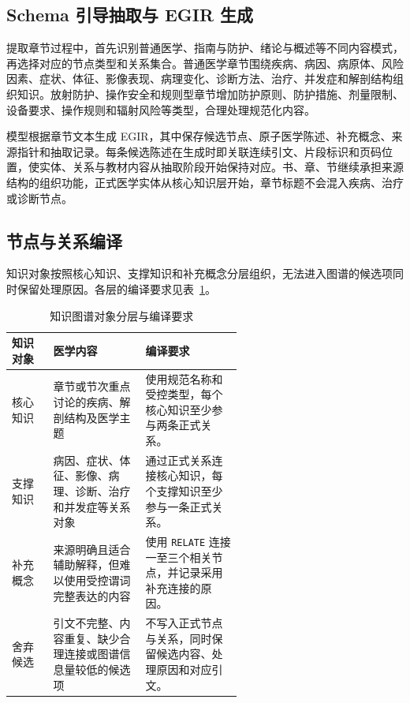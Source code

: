 \subsection{Schema 引导抽取与 EGIR 生成}

提取章节过程中，首先识别普通医学、指南与防护、绪论与概述等不同内容模式，再选择对应的节点类型和关系集合。普通医学章节围绕疾病、病因、病原体、风险因素、症状、体征、影像表现、病理变化、诊断方法、治疗、并发症和解剖结构组织知识。放射防护、操作安全和规则型章节增加防护原则、防护措施、剂量限制、设备要求、操作规则和辐射风险等类型，合理处理规范化内容。

模型根据章节文本生成 EGIR，其中保存候选节点、原子医学陈述、补充概念、来源指针和抽取记录。每条候选陈述在生成时即关联连续引文、片段标识和页码位置，使实体、关系与教材内容从抽取阶段开始保持对应。书、章、节继续承担来源结构的组织功能，正式医学实体从核心知识层开始，章节标题不会混入疾病、治疗或诊断节点。

\subsection{节点与关系编译}

知识对象按照核心知识、支撑知识和补充概念分层组织，无法进入图谱的候选项同时保留处理原因。各层的编译要求见表~\ref{tab:kg-object-contract}。

\begin{table}[H]
  \centering
  \caption{知识图谱对象分层与编译要求}
  \label{tab:kg-object-contract}
  \begin{tabularx}{\linewidth}{>{\raggedright\arraybackslash}p{0.18\linewidth}p{0.40\linewidth}X}
    \toprule
    知识对象 & 医学内容 & 编译要求 \\
    \midrule
    核心知识 & 章节或节次重点讨论的疾病、解剖结构及医学主题 & 使用规范名称和受控类型，每个核心知识至少参与两条正式关系。 \\
    支撑知识 & 病因、症状、体征、影像、病理、诊断、治疗和并发症等关系对象 & 通过正式关系连接核心知识，每个支撑知识至少参与一条正式关系。 \\
    补充概念 & 来源明确且适合辅助解释，但难以使用受控谓词完整表达的内容 & 使用 \texttt{RELATE} 连接一至三个相关节点，并记录采用补充连接的原因。 \\
    舍弃候选 & 引文不完整、内容重复、缺少合理连接或图谱信息量较低的候选项 & 不写入正式节点与关系，同时保留候选内容、处理原因和对应引文。 \\
    \bottomrule
  \end{tabularx}
\end{table}

